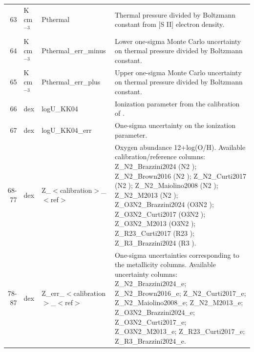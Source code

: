 \begin{longtable}{r p{} p{} p{}}
63 & K cm$^{-3}$ & Pthermal & Thermal pressure divided by Boltzmann constant from [S II] electron density. \\
64 & K cm$^{-3}$ & Pthermal\_err\_minus & Lower one-sigma Monte Carlo uncertainty on thermal pressure divided by Boltzmann constant. \\
65 & K cm$^{-3}$ & Pthermal\_err\_plus & Upper one-sigma Monte Carlo uncertainty on thermal pressure divided by Boltzmann constant. \\
66 & dex & logU\_KK04 & Ionization parameter from the calibration of \citet{Kobulnicky_2004}. \\
67 & dex & logU\_KK04\_err & One-sigma uncertainty on the ionization parameter. \\
68-77 & dex & Z\_$<$calibration$>$\_$<$ref$>$ & Oxygen abundance 12+log(O/H). Available calibration/reference columns: Z\_N2\_Brazzini2024 (N2 \citet{Brazzini_2024}); Z\_N2\_Brown2016 (N2 \citet{Brown_2016}); Z\_N2\_Curti2017 (N2 \citet{Curti_2017}); Z\_N2\_Maiolino2008 (N2 \citet{Maiolino_2008}); Z\_N2\_M2013 (N2 \citet{Marino_2013}); Z\_O3N2\_Brazzini2024 (O3N2 \citet{Brazzini_2024}); Z\_O3N2\_Curti2017 (O3N2 \citet{Curti_2017}); Z\_O3N2\_M2013 (O3N2 \citet{Marino_2013}); Z\_R23\_Curti2017 (R23 \citet{Curti_2017}); Z\_R3\_Brazzini2024 (R3 \citet{Brazzini_2024}). \\
78-87 & dex & Z\_err\_$<$calibration$>$\_$<$ref$>$ & One-sigma uncertainties corresponding to the metallicity columns. Available uncertainty columns: Z\_N2\_Brazzini2024\_e; Z\_N2\_Brown2016\_e; Z\_N2\_Curti2017\_e; Z\_N2\_Maiolino2008\_e; Z\_N2\_M2013\_e; Z\_O3N2\_Brazzini2024\_e; Z\_O3N2\_Curti2017\_e; Z\_O3N2\_M2013\_e; Z\_R23\_Curti2017\_e; Z\_R3\_Brazzini2024\_e. \\
\hline
\end{longtable}
\endgroup
